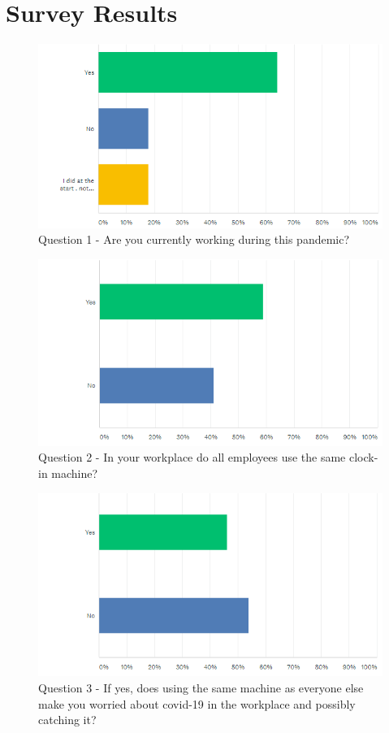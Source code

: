 \section{Survey Results}
\begin{figure}
    \includegraphics[width=1\textwidth]{img/Q1.png}
    \caption{Question 1 - Are you currently working during this pandemic?}
    \label{fig}
\end{figure}
\begin{figure}[h]
    \includegraphics[width=1\textwidth]{img/Q2.png}
    \caption{Question 2 - In your workplace do all employees use the same clock-in machine?}
    \label{fig}
\end{figure}
\begin{figure}[h]
    \includegraphics[width=1\textwidth]{img/Q3.png}
    \caption{Question 3 - If yes, does using the same machine as everyone else make you worried about covid-19 in the workplace and possibly catching it?}
    \label{fig}
\end{figure}
